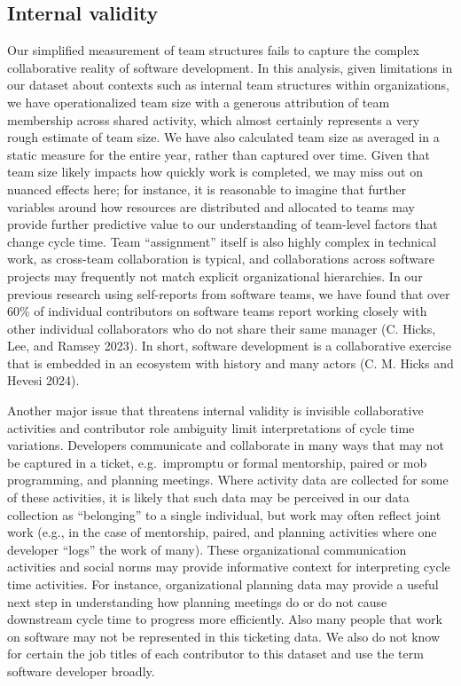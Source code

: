 \documentclass[
]{article}
\begin{document}
\subsection{Internal validity}\label{internal-validity}

Our simplified measurement of team structures fails to capture the
complex collaborative reality of software development. In this analysis,
given limitations in our dataset about contexts such as internal team
structures within organizations, we have operationalized team size with
a generous attribution of team membership across shared activity, which
almost certainly represents a very rough estimate of team size. We have
also calculated team size as averaged in a static measure for the entire
year, rather than captured over time. Given that team size likely
impacts how quickly work is completed, we may miss out on nuanced
effects here; for instance, it is reasonable to imagine that further
variables around how resources are distributed and allocated to teams
may provide further predictive value to our understanding of team-level
factors that change cycle time. Team ``assignment'' itself is also
highly complex in technical work, as cross-team collaboration is
typical, and collaborations across software projects may frequently not
match explicit organizational hierarchies. In our previous research
using self-reports from software teams, we have found that over 60\% of
individual contributors on software teams report working closely with
other individual collaborators who do not share their same manager (C.
Hicks, Lee, and Ramsey 2023). In short, software development is a
collaborative exercise that is embedded in an ecosystem with history and
many actors (C. M. Hicks and Hevesi 2024).

Another major issue that threatens internal validity is invisible
collaborative activities and contributor role ambiguity limit
interpretations of cycle time variations. Developers communicate and
collaborate in many ways that may not be captured in a ticket,
e.g.~impromptu or formal mentorship, paired or mob programming, and
planning meetings. Where activity data are collected for some of these
activities, it is likely that such data may be perceived in our data
collection as ``belonging'' to a single individual, but work may often
reflect joint work (e.g., in the case of mentorship, paired, and
planning activities where one developer ``logs'' the work of many).
These organizational communication activities and social norms may
provide informative context for interpreting cycle time activities. For
instance, organizational planning data may provide a useful next step in
understanding how planning meetings do or do not cause downstream cycle
time to progress more efficiently. Also many people that work on
software may not be represented in this ticketing data. We also do not
know for certain the job titles of each contributor to this dataset and
use the term software developer broadly.
\end{document}
